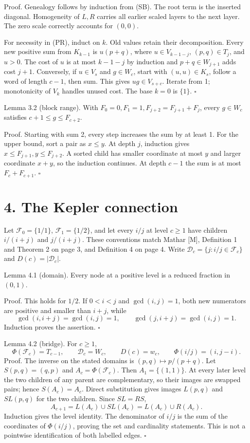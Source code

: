 \documentclass[11pt]{article}
\begin{document}
Proof. Genealogy follows by induction from (SB). The root term is the inserted diagonal. Homogeneity of \(L,R\) carries all earlier scaled layers to the next layer. The zero scale correctly accounts for \((0,0)\).

For necessity in (PR), induct on \(k\). Old values retain their decomposition. Every new positive sum from \(K_{k-1}\) is \(u(p+q)\), where \(u\in V_{k-1-j}\), \((p,q)\in T_j\), and \(u>0\). The cost of \(u\) is at most \(k-1-j\) by induction and \(p+q\in W_{j+1}\) adds cost \(j+1\). Conversely, if \(u\in V_s\) and \(g\in W_c\), start with \((u,u)\in K_s\), follow a word of length \(c-1\), then sum. This gives \(ug\in V_{s+c}\). Iterate from 1; monotonicity of \(V_k\) handles unused cost. The base \(k=0\) is \(\{1\}\). \(\square\)

Lemma 3.2 (block range). With \(F_0=0,F_1=1,F_{j+2}=F_{j+1}+F_j\), every \(g\in W_c\) satisfies \(c+1\le g\le F_{c+2}\).

Proof. Starting with sum 2, every step increases the sum by at least 1. For the upper bound, sort a pair as \(x\le y\). At depth \(j\), induction gives \(x\le F_{j+1},y\le F_{j+2}\). A sorted child has smaller coordinate at most \(y\) and larger coordinate \(x+y\), so the induction continues. At depth \(c-1\) the sum is at most \(F_c+F_{c+1}\). \(\square\)

\section*{4. The Kepler connection}

Let \(\mathcal F_0=\{1/1\}\), \(\mathcal F_1=\{1/2\}\), and let every \(i/j\) at level \(c\ge1\) have children \(i/(i+j)\) and \(j/(i+j)\). These conventions match Mathar [M], Definition 1 and Theorem 2 on page 3, and Definition 4 on page 4. Write \(\mathcal D_c=\{j:i/j\in\mathcal F_c\}\) and \(D(c)=|\mathcal D_c|\).

Lemma 4.1 (domain). Every node at a positive level is a reduced fraction in \((0,1)\).

Proof. This holds for \(1/2\). If \(0<i<j\) and \(\gcd(i,j)=1\), both new numerators are positive and smaller than \(i+j\), while
\[
\gcd(i,i+j)=\gcd(i,j)=1,\qquad \gcd(j,i+j)=\gcd(i,j)=1.
\]
Induction proves the assertion. \(\square\)

Lemma 4.2 (bridge). For \(c\ge1\),
\[
\Phi(\mathcal F_c)=T_{c-1},\qquad
\mathcal D_c=W_c,\qquad D(c)=w_c,\qquad
\Phi(i/j)=(i,j-i).
\]
Proof. The inverse on the stated domains is \((p,q)\mapsto p/(p+q)\). Let \(S(p,q)=(q,p)\) and \(A_c=\Phi(\mathcal F_c)\). Then \(A_1=\{(1,1)\}\). At every later level the two children of any parent are complementary, so their images are swapped pairs; hence \(S(A_c)=A_c\). Direct substitution gives images \(L(p,q)\) and \(SL(p,q)\) for the two children. Since \(SL=RS\),
\[
A_{c+1}=L(A_c)\cup SL(A_c)=L(A_c)\cup R(A_c).
\]
Induction gives the level identity. The denominator of \(i/j\) is the sum of the coordinates of \(\Phi(i/j)\), proving the set and cardinality statements. This is not a pointwise identification of both labelled edges. \(\square\)
\end{document}
